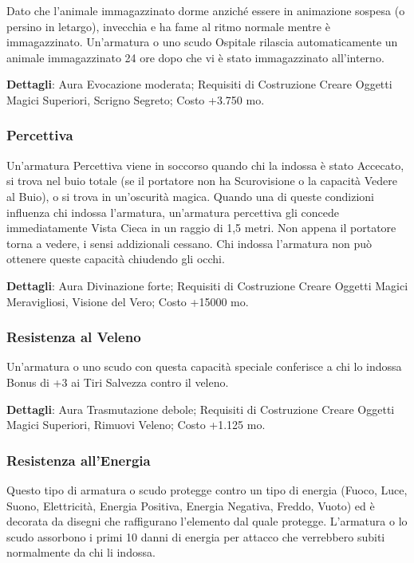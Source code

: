 \begin{multicols}{2}
	Dato che l'animale immagazzinato dorme anziché essere in animazione sospesa (o persino in letargo), invecchia e ha fame al ritmo normale mentre è immagazzinato. Un'armatura o uno scudo Ospitale rilascia automaticamente un animale immagazzinato 24 ore dopo che vi è stato immagazzinato all'interno.

	\textbf{Dettagli}: Aura Evocazione moderata; Requisiti di Costruzione Creare Oggetti Magici Superiori, Scrigno Segreto; Costo +3.750 mo.


	\subsubsection*{Percettiva}

	Un'armatura Percettiva viene in soccorso quando chi la indossa è stato Accecato, si trova nel buio totale (se il portatore non ha Scurovisione o la capacità Vedere al Buio), o si trova in un'oscurità magica. Quando una di queste condizioni influenza chi indossa l'armatura, un'armatura percettiva gli concede immediatamente Vista Cieca in un raggio di 1,5 metri. Non appena il portatore torna a vedere, i sensi addizionali cessano. Chi indossa l'armatura non può ottenere queste capacità chiudendo gli occhi.

	\textbf{Dettagli}: Aura Divinazione forte; Requisiti di Costruzione Creare Oggetti Magici Meravigliosi, Visione del Vero; Costo +15000 mo.

	\subsubsection*{Resistenza al Veleno}

	Un'armatura o uno scudo con questa capacità speciale conferisce a chi lo indossa Bonus di +3 ai Tiri Salvezza contro il veleno.

	\textbf{Dettagli}: Aura Trasmutazione debole; Requisiti di Costruzione Creare Oggetti Magici Superiori, Rimuovi Veleno; Costo +1.125 mo.

	\subsubsection*{Resistenza all'Energia}

	Questo tipo di armatura o scudo protegge contro un tipo di energia (Fuoco, Luce, Suono, Elettricità, Energia Positiva, Energia Negativa, Freddo, Vuoto) ed è decorata da disegni che raffigurano l'elemento dal quale protegge. L'armatura o lo scudo assorbono i primi 10 danni di energia per attacco che verrebbero subiti normalmente da chi li indossa.


\end{multicols}
